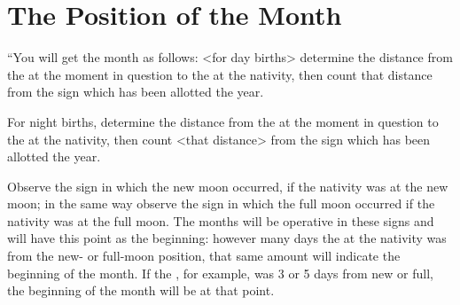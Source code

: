 \section{The Position of the Month}

“You will get the month as follows: <for day births> determine the distance from the \Sun\xspace at the moment in question to the \Sun\xspace at the nativity, then count that distance from the sign which has been allotted the year. 

For night births, determine the distance from the \Moon\xspace at the moment in question to the \Moon\xspace at the nativity, then count <that distance> from the sign which has been allotted the year. 

Observe the sign in which the new moon occurred, if the nativity was at the new moon; in the same way observe the sign in which the full moon occurred if the nativity was at the full moon. The months will be operative in these signs and will have this point as the beginning: however many days the \Moon\xspace at the nativity was from the new- or full-moon position, that same amount will indicate the beginning of the month. If the \Moon, for example, was 3 or 5 days from new or full, the beginning of the month will be at that point.

\newpage
